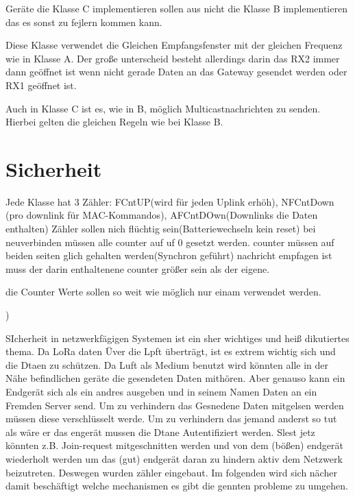 \documentclass[a4paper,12pt]{article}
\begin{document}
            Geräte die Klasse C implementieren sollen aus nicht die Klasse B implementieren das es sonst zu fejlern 
            kommen kann.

            Diese Klasse verwendet die Gleichen Empfangsfenster mit der gleichen Frequenz wie in Klasse A. Der große 
            unterscheid besteht allerdings darin das RX2 immer dann geöffnet ist wenn nicht gerade Daten an das 
            Gateway gesendet werden oder RX1 geöffnet ist. 

            Auch in Klasse C ist es, wie in B, möglich Multicastnachrichten zu senden. Hierbei gelten die gleichen 
            Regeln wie bei Klasse B.

\section{Sicherheit} \label{sec:Sicherheit}
    Jede Klasse hat 3 Zähler: FCntUP(wird für jeden Uplink erhöh), NFCntDown (pro downlink für MAC-Kommandos), AFCntDOwn(Downlinks die Daten enthalten) Zähler sollen nich flüchtig sein(Batteriewechseln kein reset) bei neuverbinden müssen alle counter auf uf 0 gesetzt werden. counter müssen auf beiden seiten glich gehalten werden(Synchron geführt) nachricht empfagen ist muss der darin enthaltenene counter größer sein als der eigene. 

    die Counter Werte sollen so weit wie möglich nur einam verwendet werden.
    
    )
    \


                
        SIcherheit in netzwerkfägigen Systemen ist ein sher wichtiges und heiß dikutiertes thema. Da LoRa daten Üver die Lpft überträgt, ist es extrem wichtig sich und die Dtaen zu schützen.
        Da Luft als Medium benutzt wird könnten alle in der Nähe befindlichen geräte die gesendeten Daten mithören. Aber genauso kann ein Endgerät sich als ein andres ausgeben und in seinem Namen Daten an ein
        Fremden Server send. Um zu verhindern das Gesnedene Daten mitgelsen werden müssen diese verschlüsselt werde. Um zu verhindern das jemand anderst so tut als wäre er das engerät mussen die Dtane Autentifiziert werden.
        Slest jetz könnten z.B. Join-request mitgeschnitten werden und von dem (bößen) endgerät wiederholt werden um das (gut) endgerät daran zu hindern aktiv dem Netzwerk beizutreten. Deswegen wurden zähler eingebaut. Im folgenden wird sich nächer damit beschäftigt welche mechanismen es gibt die gennten probleme zu umgehen.
        
\end{document}
